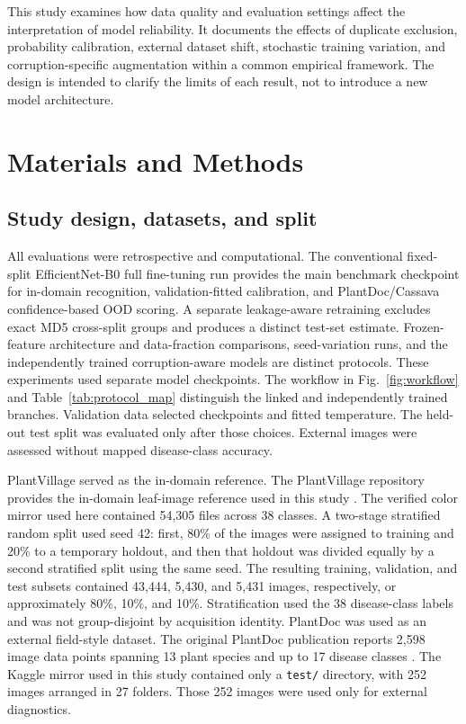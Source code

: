 \documentclass{sbc2023}%
\begin{document}
This study examines how data quality and evaluation settings affect the interpretation of model reliability. It documents the effects of duplicate exclusion, probability calibration, external dataset shift, stochastic training variation, and corruption-specific augmentation within a common empirical framework. The design is intended to clarify the limits of each result, not to introduce a new model architecture.

\section{Materials and Methods}\label{sec:methods}
\subsection{Study design, datasets, and split}
All evaluations were retrospective and computational. The conventional fixed-split EfficientNet-B0 full fine-tuning run provides the main benchmark checkpoint for in-domain recognition, validation-fitted calibration, and PlantDoc/Cassava confidence-based OOD scoring. A separate leakage-aware retraining excludes exact MD5 cross-split groups and produces a distinct test-set estimate. Frozen-feature architecture and data-fraction comparisons, seed-variation runs, and the independently trained corruption-aware models are distinct protocols. These experiments used separate model checkpoints. The workflow in Fig.~\ref{fig:workflow} and Table~\ref{tab:protocol_map} distinguish the linked and independently trained branches. Validation data selected checkpoints and fitted temperature. The held-out test split was evaluated only after those choices. External images were assessed without mapped disease-class accuracy.


PlantVillage served as the in-domain reference. The PlantVillage repository provides the in-domain leaf-image reference used in this study \cite{r01}. The verified color mirror used here contained 54,305 files across 38 classes. A two-stage stratified random split used seed 42: first, 80\% of the images were assigned to training and 20\% to a temporary holdout, and then that holdout was divided equally by a second stratified split using the same seed. The resulting training, validation, and test subsets contained 43,444, 5,430, and 5,431 images, respectively, or approximately 80\%, 10\%, and 10\%. Stratification used the 38 disease-class labels and was not group-disjoint by acquisition identity. PlantDoc was used as an external field-style dataset. The original PlantDoc publication reports 2,598 image data points spanning 13 plant species and up to 17 disease classes \cite{r02}. The Kaggle mirror used in this study contained only a \texttt{test/} directory, with 252 images arranged in 27 folders. Those 252 images were used only for external diagnostics.
\end{document}
